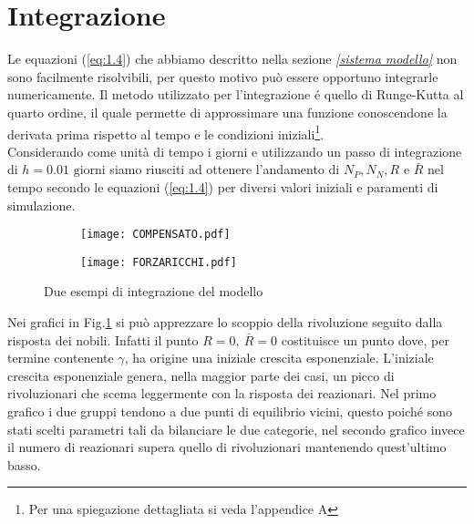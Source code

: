 \section{Integrazione}
Le equazioni (\ref{eq:1.4}) che abbiamo descritto nella sezione \emph{\ref{sistema modello}} non sono facilmente risolvibili, per questo motivo può essere opportuno integrarle numericamente. Il metodo utilizzato per l'integrazione é quello di Runge-Kutta al quarto ordine, il quale permette di approssimare una funzione conoscendone la derivata prima rispetto al tempo e le condizioni iniziali\footnote{Per una spiegazione dettagliata si veda l'appendice A}. \\
Considerando come unità di tempo i giorni e utilizzando un passo di integrazione di $ h=0.01 \text{ giorni}$ siamo riusciti ad ottenere l'andamento di $ N_{P}, N_{N}, R$ e $\bar{R} $ nel tempo secondo le equazioni (\ref{eq:1.4}) per diversi valori iniziali e paramenti di simulazione.
\begin{figure}[H]
	\centering
	\begin{subfigure}[H]{0.49\textwidth}
		\centering
		\texttt{[image: COMPENSATO.pdf]}
	\end{subfigure}
	\hfill
	\begin{subfigure}[H]{0.49\textwidth}
		\centering
		\texttt{[image: FORZARICCHI.pdf]}
	\end{subfigure}
\caption{Due esempi di integrazione del modello}
\label{grafici integrazione}
\end{figure}
Nei grafici in Fig.\ref{grafici integrazione} si può apprezzare lo scoppio della rivoluzione seguito dalla risposta dei nobili. Infatti il punto $R=0,\ \bar{R}=0$ costituisce un punto dove, per termine contenente $\gamma$, ha origine una iniziale crescita esponenziale. L'iniziale crescita esponenziale genera, nella maggior parte dei casi, un picco di rivoluzionari che scema leggermente con la risposta dei reazionari. Nel primo grafico i due gruppi tendono a due punti di equilibrio vicini, questo poiché sono stati scelti parametri tali da bilanciare le due categorie, nel secondo grafico invece il numero di reazionari supera quello di rivoluzionari mantenendo quest'ultimo basso.
